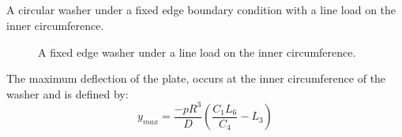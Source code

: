 \documentclass[10pt,letterpaper]{report}
\numberwithin{equation}{chapter}
\begin{document}
\subsection{}
\label{subsec:fwp} %
A circular washer under a fixed edge boundary condition with a line load on the inner circumference.
\begin{figure}[!ht]
\centering
\label{fig:fwp}
    \hfill
    \caption{A fixed edge washer under a line load on the inner circumference.}
    \label{fig:dummy}
\end{figure}
The maximum deflection of the plate, occurs at the inner circumference of the washer and is defined by:
\[y_{max}=\frac{-p R^3}{D}\left(\frac{C_1 L_6}{C_4} - L_3\right)\]

\newpage
\end{document}
